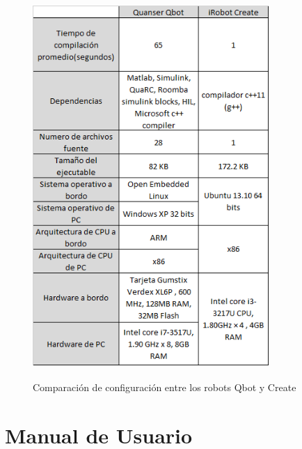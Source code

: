 \documentclass[letterpaper,openright,12pt]{book}
\begin{document}
\begin{figure}
\begin{center}
\includegraphics[width=0.8\textwidth]{figures/tabla.png}
\caption{Comparación de configuración entre los robots Qbot y Create\textsuperscript{\textregistered}}
\centering
\label{fig:tabla}
\end{center}
\end{figure} 


\chapter{Manual de Usuario}
\end{document}
